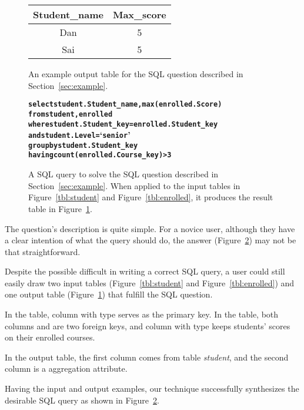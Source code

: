 \begin{figure}[t]
	\centering
\begin{tabular}{|c|c|}
\hline
 Student\_name & Max\_score \\
\hline
 Dan & 5 \\
\hline
 Sai & 5 \\
 \hline
\end{tabular}
	\caption{An example output table for the SQL question described in
Section~\ref{sec:example}.}
	\label{tbl:output}
\vspace{3mm}
\end{figure}		


\begin{figure}[t]
\begin{CodeOut}
\begin{alltt}
\textbf{select student.Student\_name, max(enrolled.Score)
from student, enrolled
where student.Student\_key = enrolled.Student\_key
      and student.Level = `senior'
group by student.Student\_key
having count(enrolled.Course\_key) > 3}
\end{alltt}
\end{CodeOut}
\vspace{-5mm}
	\caption{A SQL query to solve the SQL question described in
Section~\ref{sec:example}. When applied to the input tables in
Figure~\ref{tbl:student} and Figure~\ref{tbl:enrolled}, it produces the result table
in Figure~\ref{tbl:output}.}
	\label{fig:expected_sql}
\end{figure}

The question's description is quite simple.
For a novice user, although they have a clear
intention of what the query should do, the answer (Figure~\ref{fig:expected_sql}) may
not be that straightforward. 

Despite the possible difficult in writing a correct SQL query,
a user could still easily draw
two input tables (Figure~\ref{tbl:student} and Figure~\ref{tbl:enrolled})
and one output table (Figure~\ref{tbl:output}) that fulfill the
SQL question.

In the  table, column {} with
 type serves as the primary key. 
In the  table, both columns {} and
{} are two foreign keys, and column {}
with  type keeps students' scores on their enrolled courses.

In the output table, the first column  {}
comes from table \textit{student}, and the second column {}
is a aggregation attribute.%

Having the input and output examples, our technique successfully synthesizes
the desirable SQL query as shown in Figure~\ref{fig:expected_sql}.
